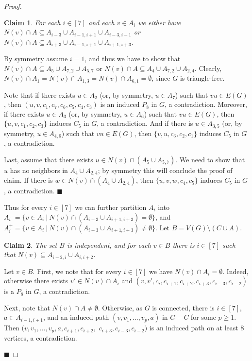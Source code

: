 \documentclass[11pt,a4paper]{article}
\theoremstyle{mystyle}
\newtheorem{claim}{Claim}[theorem]
\newenvironment{claimproof}{\noindent {\emph{Proof of Claim.}}}{\hfill$\blacksquare$\medskip}
\begin{document}
\begin{proof}
\begin{claim}
For each $i \in [7]$ and each $v \in A_i$ we either have $N(v) \cap A \subseteq A_{i-3} \cup A_{i-1,i+1} \cup A_{i-3,i-1}$ or $N(v) \cap A \subseteq A_{i+3}\cup A_{i-1,i+1} \cup A_{i+1,i+3}$.
\end{claim}
\begin{claimproof}
By symmetry assume $i=1$, and thus we have to show that $N(v) \cap A \subseteq A_{5} \cup A_{7,2} \cup A_{5,7}$ or $N(v) \cap A \subseteq A_{4}\cup A_{7,2} \cup A_{2,4}$. Clearly, $N(v) \cap A_1=N(v) \cap A_{1,3} = N(v) \cap A_{6,1} = \emptyset$, since $G$ is triangle-free.

Note that if there exists $u \in A_{2}$ (or, by symmetry, $u\in A_{7}$) such that $vu \in E(G)$, then $(u,v,c_1,c_7,c_6,c_5,c_4,c_3)$ is an induced $P_8$ in $G$, a contradiction. 
Moreover, if there exists $u \in A_{3}$ (or, by symmetry, $u\in A_{6}$) such that $vu \in E(G)$, then $\{u,v,c_1,c_2,c_3\}$ induces $C_5$ in $G$, a contradiction.
And if there is $u \in A_{3,5}$ (or, by symmetry, $u\in A_{4,6}$) such that $vu \in E(G)$, then $\{v,u,c_3,c_2,c_1\}$ induces $C_5$ in $G$, a contradiction.

Last, assume that there exists $u \in N(v) \cap (A_{5} \cup A_{5,7})$. We need to show that $u$ has no neighbors in $A_{4} \cup A_{2,4}$; by symmetry this will conclude the proof of claim.
If there is $w \in N(v) \cap (A_{4} \cup A_{2,4})$, then $\{u,v,w,c_4,c_5\}$ induces $C_5$ in $G$, a contradiction.
\end{claimproof}

Thus for every $i\in [7]$ we can further partition $A_i$ into $A^-_i=\{v \in A_i~|~N(v) \cap (A_{i+3}\cup A_{i+1,i+3})=\emptyset\}$, and $A^+_i=\{v \in A_i~|~N(v) \cap (A_{i+3}\cup A_{i+1,i+3})\neq\emptyset\}$.
Let $B = V(G) \setminus (C \cup A)$.

\begin{claim}
The set $B$ is independent, and for each $v \in B$ there is $i \in [7]$ such that $N(v) \subseteq A_{i-2,i} \cup A_{i,i+2}$.
\end{claim}
\begin{claimproof}
Let $v \in B$.
First, we note that for every $i \in [7]$ we have $N(v) \cap A_i = \emptyset$. Indeed, otherwise there exists $v' \in N(v) \cap A_i$ and $(v,v',c_i,c_{i+1},c_{i+2},c_{i+3},c_{i-3},c_{i-2})$ is a $P_8$ in $G$, a contradiction.

Next, note that $N(v) \cap A \neq \emptyset$. Otherwise, as $G$ is connected, there is $i \in [7]$, $a \in A_{i-1,i+1}$, and an induced path $(v,v_1,\ldots,v_p,a)$ in $G-C$ for some $p \geq 1$. Then $(v,v_1,\ldots,v_p,a,c_{i+1},c_{i+2},$ $c_{i+3},c_{i-3},c_{i-2})$ is an induced path on at least 8 vertices, a contradiction.


\end{claimproof}
\end{proof}
\end{document}
